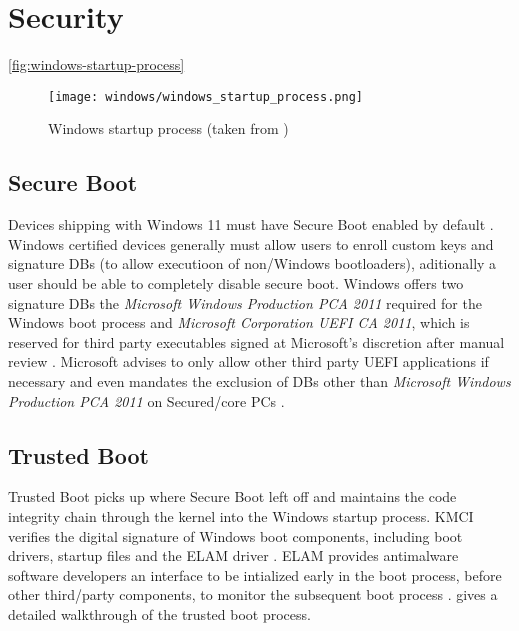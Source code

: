 
\section{Security}

\autoref{fig:windows-startup-process}

\begin{figure}[phtb]
    \centering
    \texttt{[image: windows/windows\_startup\_process.png]}
    \caption{Windows startup process (taken from \cite{microsoft-secure-the-windows-boot-process})}
    \label{fig:windows-startup-process}
\end{figure}

\subsection{Secure Boot}

Devices shipping with Windows 11 must have Secure Boot enabled by default \cite{microsoft-windows-minimum-hardware-requirements-overview}.
Windows certified devices generally must allow users to enroll custom keys and signature \acp{DB} (to allow executioon of non\-/Windows bootloaders), aditionally a user should be able to completely disable secure boot.
Windows offers two signature \acp{DB} the \emph{Microsoft Windows Production PCA 2011} required for the Windows boot process and \emph{Microsoft Corporation \ac{UEFI} \ac{CA} 2011}, which is reserved for third party executables signed at Microsoft's discretion after manual review  \cite{microsoft-uefi-signing}.
Microsoft advises to only allow other third party \ac{UEFI} applications if necessary and even mandates the exclusion of \acp{DB} other than \emph{Microsoft Windows Production PCA 2011} on Secured\-/core \acp{PC} \cite{microsoft-secure-the-windows-boot-process}.

\subsection{Trusted Boot}

Trusted Boot picks up where Secure Boot left off and maintains the code integrity chain through the kernel into the Windows startup process.
\ac{KMCI} verifies the digital signature of Windows boot components, including boot drivers, startup files and the \ac{ELAM} driver \cite{microsoft-trusted-boot}.
\ac{ELAM} provides antimalware software developers an interface to be intialized early in the boot process, before other third\-/party components, to monitor the subsequent boot process \cite{micosoft-windows-elam}.
\cite{understanding-windows-trusted-boot} gives a detailed walkthrough of the trusted boot process.

